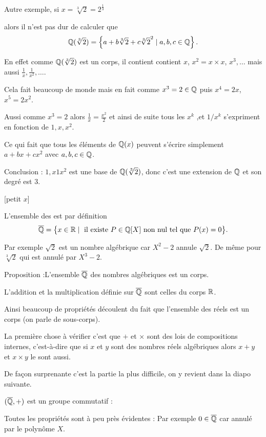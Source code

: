 \change
Autre exemple, si $x = \sqrt[3]{2} = 2^{\frac13}$ 

\change
alors il n'est pas dur de calculer que 
$$\mathbb{Q}(\sqrt[3]{2}) = \left\{ a+b\sqrt[3]{2}+c\sqrt[3]{2}^2 \mid a,b,c \in \mathbb{Q} \right\}.$$

\change
En effet comme $\mathbb{Q}(\sqrt[3]{2})$ est un corps, il contient contient $x$, $x^2 = x \times x$, $x^3,\ldots$ 
mais aussi $\frac1x, \frac 1{x^2},\ldots$.

\change
Cela fait beaucoup de monde mais en fait comme $x^3 = 2 \in \mathbb{Q}$ 
puis $x^4 = 2x$, $x^5 = 2x^2$.

\change
Aussi comme $x^3 = 2$ alors $\frac1x = \frac{x^2}{2}$ et ainsi de suite 
tous les $x^k$ ,et $1/x^k$
 s'expriment en fonction de $1, x, x^2$.

\change
Ce qui fait que tous les éléments de $\mathbb{Q}(x)$
peuvent s'écrire simplement $a + bx + cx^2$ avec $a,b,c \in \mathbb{Q}$.

\change
Conclusion : $1,x1x^2$ est une base de $\mathbb{Q}(\sqrt[3]{2})$, donc c'est une extension de $\mathbb{Q}$ et son degré est $3$.

\diapo

[petit $x$]

L'ensemble des  est par définition
$$\overline{\mathbb{Q}} = \big\{ x \in \mathbb{R} \mid \text{ il existe } P \in \mathbb{Q}[X] \text{ non nul tel que } P(x)=0\big\}.$$

Par exemple $\sqrt{2}$ est un nombre algébrique car $X^2-2$ annule $\sqrt 2$.
De même pour $\sqrt[3]{2}$ qui est annulé par $X^3-2$.

\change
Proposition :L'ensemble $\overline{\mathbb{Q}}$ des nombres algébriques est un corps.


\change
L'addition et la multiplication définie sur $\overline{\mathbb{Q}}$ sont celles du corps $\mathbb{R}$.

Ainsi beaucoup de propriétés découlent du fait que 
l'ensemble des réels est un corps (on parle de sous-corps).

La première chose à vérifier c'est que $+$ et $\times$ sont des lois de compositions internes,
c'est-à-dire que si $x$ et $y$ sont des nombres réels algébriques alors $x+y$ et $x\times y$ le sont aussi.

De façon surprenante c'est la partie la plus difficile, on y revient dans la diapo suivante.

\change
$(\overline{\mathbb{Q}},+)$ est un groupe commutatif :

Toutes les propriétés sont à peu près évidentes :
 Par exemple   $0 \in \overline{\mathbb{Q}}$ car annulé par le polynôme $X$.
 

